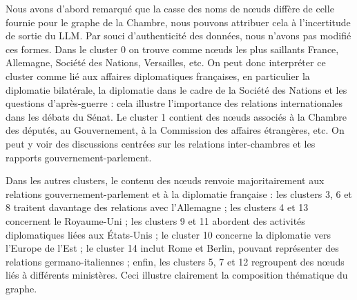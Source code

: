 \documentclass[a4paper,twoside,12pt]{book}
\begin{document}
Nous avons d'abord remarqué que la casse des noms de nœuds diffère de celle fournie pour le graphe de la Chambre, nous pouvons attribuer cela à l'incertitude de sortie du LLM. Par souci d'authenticité des données, nous n'avons pas modifié ces formes. Dans le cluster 0 on trouve comme nœuds les plus saillants France, Allemagne, Société des Nations, Versailles, etc. On peut donc interpréter ce cluster comme lié aux affaires diplomatiques françaises, en particulier la diplomatie bilatérale, la diplomatie dans le cadre de la Société des Nations et les questions d'après-guerre : cela illustre l'importance des relations internationales dans les débats du Sénat. Le cluster 1 contient des nœuds associés à la Chambre des députés, au Gouvernement, à la Commission des affaires étrangères, etc. On peut y voir des discussions centrées sur les relations inter-chambres et les rapports gouvernement-parlement.

Dans les autres clusters, le contenu des nœuds renvoie majoritairement aux relations gouvernement-parlement et à la diplomatie française : les clusters 3, 6 et 8 traitent davantage des relations avec l'Allemagne ; les clusters 4 et 13 concernent le Royaume-Uni ; les clusters 9 et 11 abordent des activités diplomatiques liées aux États-Unis ; le cluster 10 concerne la diplomatie vers l'Europe de l'Est ; le cluster 14 inclut Rome et Berlin, pouvant représenter des relations germano-italiennes ; enfin, les clusters 5, 7 et 12 regroupent des nœuds liés à différents ministères. Ceci illustre clairement la composition thématique du graphe.
\end{document}
